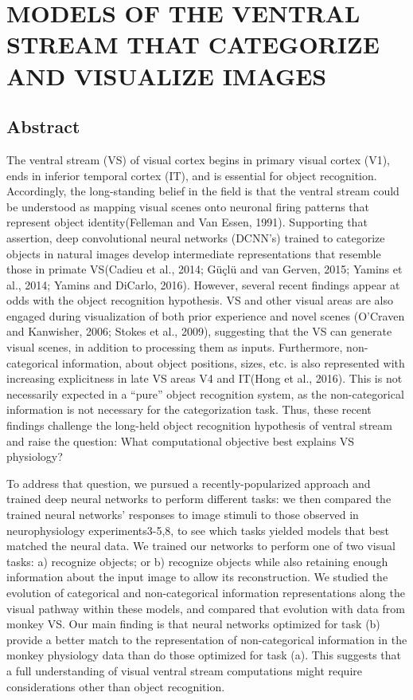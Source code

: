 \documentclass{templates/ucdenverthesis}
\begin{document}
\hypertarget{ch4:intro}{%
\chapter{MODELS OF THE VENTRAL STREAM THAT CATEGORIZE AND VISUALIZE IMAGES}\label{ch4:intro}}

\hypertarget{abstract-1}{%
\section*{Abstract}\label{abstract-1}}

The ventral stream (VS) of visual cortex begins in primary visual cortex (V1), ends in inferior temporal cortex (IT), and is essential for object recognition.
Accordingly, the long-standing belief in the field is that the ventral stream could be understood as mapping visual scenes onto neuronal firing patterns that represent object identity(Felleman and Van Essen, 1991).
Supporting that assertion, deep convolutional neural networks (DCNN's) trained to categorize objects in natural images develop intermediate representations that resemble those in primate VS(Cadieu et al., 2014; Güçlü and van Gerven, 2015; Yamins et al., 2014; Yamins and DiCarlo, 2016).
However, several recent findings appear at odds with the object recognition hypothesis.
VS and other visual areas are also engaged during visualization of both prior experience and novel scenes (O'Craven and Kanwisher, 2006; Stokes et al., 2009), suggesting that the VS can generate visual scenes, in addition to processing them as inputs. Furthermore, non-categorical information, about object positions, sizes, etc. is also represented with increasing explicitness in late VS areas V4 and IT(Hong et al., 2016).
This is not necessarily expected in a ``pure'' object recognition system, as the non-categorical information is not necessary for the categorization task. Thus, these recent findings challenge the long-held object recognition hypothesis of ventral stream and raise the question: What computational objective best explains VS physiology? \autocite{Richards}

To address that question, we pursued a recently-popularized approach and trained deep neural networks to perform different tasks: we then compared the trained neural networks' responses to image stimuli to those observed in neurophysiology experiments3-5,8, to see which tasks yielded models that best matched the neural data. We trained our networks to perform one of two visual tasks: a) recognize objects; or b) recognize objects while also retaining enough information about the input image to allow its reconstruction. We studied the evolution of categorical and non-categorical information representations along the visual pathway within these models, and compared that evolution with data from monkey VS. Our main finding is that neural networks optimized for task (b) provide a better match to the representation of non-categorical information in the monkey physiology data than do those optimized for task (a). This suggests that a full understanding of visual ventral stream computations might require considerations other than object recognition.
\end{document}
